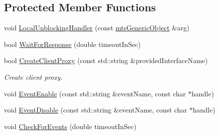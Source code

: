 \subsection*{Protected Member Functions}
\begin{DoxyCompactItemize}
\item 
void \hyperlink{classmts_socket_proxy_client_a8f39c906476855375c0e5f7ecdedc013}{Local\+Unblocking\+Handler} (const \hyperlink{classmts_generic_object}{mts\+Generic\+Object} \&arg)
\item 
bool \hyperlink{classmts_socket_proxy_client_af6b80c4a3ecf7d6f0cee93869df48ac8}{Wait\+For\+Response} (double timeout\+In\+Sec)
\item 
bool \hyperlink{classmts_socket_proxy_client_ac8874a9dfa82352906277e4ff8b05bdc}{Create\+Client\+Proxy} (const std\+::string \&provided\+Interface\+Name)
\begin{DoxyCompactList}\small\item\em Create client proxy. \end{DoxyCompactList}\item 
void \hyperlink{classmts_socket_proxy_client_a80af494a9712f53ccb04cd1e749c2e25}{Event\+Enable} (const std\+::string \&event\+Name, const char $\ast$handle)
\item 
void \hyperlink{classmts_socket_proxy_client_a295dd30cfb03e066ef9f2cd0e467355a}{Event\+Disable} (const std\+::string \&event\+Name, const char $\ast$handle)
\item 
void \hyperlink{classmts_socket_proxy_client_a27acfaf6fae696c609b6c6c9f1a744f4}{Check\+For\+Events} (double timeout\+In\+Sec)
\end{DoxyCompactItemize}
